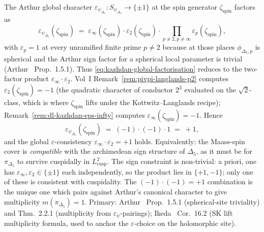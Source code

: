 \begin{remark}[Global consistency: $\varepsilon_\infty\cdot\varepsilon_2 = 1$]
\label{rem:dl-kazhdan-global-consistency}
The Arthur global character
$\varepsilon_{\psi_{\Delta_5}}\colon S_{\psi_{\Delta_5}} \to \{\pm 1\}$
at the spin generator $\zeta_{\mathrm{spin}}$ factors as
\begin{equation}
\label{eq:kazhdan-global-factorisation}
 \varepsilon_{\psi_{\Delta_5}}(\zeta_{\mathrm{spin}})
 \;=\;
 \varepsilon_\infty(\zeta_{\mathrm{spin}})
 \cdot
 \varepsilon_2(\zeta_{\mathrm{spin}})
 \cdot
 \prod_{p\ne 2, p\ne\infty}\varepsilon_p(\zeta_{\mathrm{spin}}),
\end{equation}
with $\varepsilon_p = 1$ at every unramified finite prime $p \ne 2$
because at those places $\phi_{\Delta_5, p}$ is spherical and the
Arthur sign factor for a spherical local parameter is trivial
(Arthur~\cite{Arthur2013Endoscopic} Prop.\ 1.5.1). Thus
\eqref{eq:kazhdan-global-factorisation} reduces to the
two-factor product $\varepsilon_\infty\cdot\varepsilon_2$. Vol~I
Remark~\ref{rem:pivpi-langlands-p2} computes
$\varepsilon_2(\zeta_{\mathrm{spin}}) = -1$
(the quadratic character of conductor $2^3$ evaluated on the
$\sqrt{2}$-class, which is where $\zeta_{\mathrm{spin}}$ lifts under the
Kottwitz--Langlands recipe);
Remark~\ref{rem:dl-kazhdan-eps-infty}
computes $\varepsilon_\infty(\zeta_{\mathrm{spin}}) = -1$. Hence
\begin{equation}
\label{eq:kazhdan-product-one}
 \varepsilon_{\psi_{\Delta_5}}(\zeta_{\mathrm{spin}})
 \;=\;
 (-1)\cdot(-1)\cdot 1
 \;=\;
 +1,
\end{equation}
and the global $\varepsilon$-consistency
$\varepsilon_\infty\cdot\varepsilon_2 = +1$ holds.
Equivalently: the Maass-spin cover is \emph{compatible} with the
archimedean sign structure of $\Delta_5$, as it must be for
$\pi_{\Delta_5}$ to survive cuspidally in $L^2_{\mathrm{cusp}}$. The
sign constraint is non-trivial: a priori, one has
$\varepsilon_\infty,\varepsilon_2 \in \{\pm 1\}$ each independently,
so the product lies in $\{+1, -1\}$; only one of these is consistent
with cuspidality. The $(-1)\cdot(-1) = +1$ combination is the
unique one which pairs against Arthur's canonical character to give
multiplicity $m(\pi_{\Delta_5}) = 1$. Primary:
Arthur~\cite{Arthur2013Endoscopic} Prop.\ 1.5.1 (spherical-site
triviality) and Thm.\ 2.2.1 (multiplicity from
$\varepsilon_\psi$-pairings);
Ikeda~\cite{Ikeda2001Lifting} Cor.\ 16.2 (SK lift multiplicity
formula, used to anchor the $\varepsilon$-choice on the
holomorphic site).
\end{remark}

